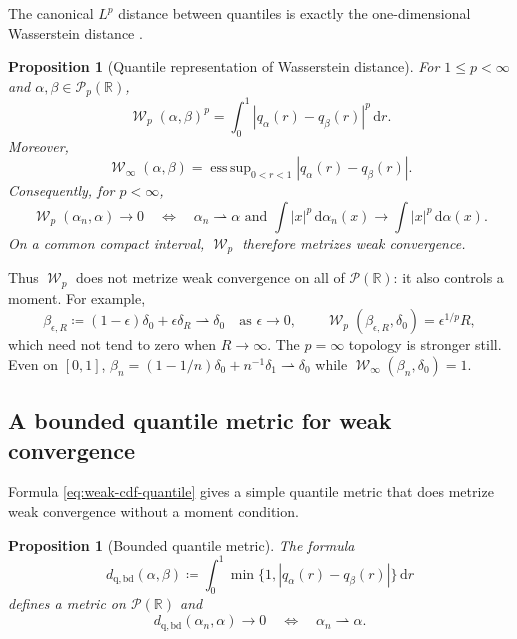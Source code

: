 \documentclass[11pt]{article}
\newtheorem{proposition}[theorem]{Proposition}
\newcommand{\RR}{\mathbb R}
\newcommand{\Pp}{\mathcal P}
\renewcommand{\d}{\,\mathrm d}
\newcommand{\al}{\alpha}
\newcommand{\be}{\beta}
\newcommand{\de}{\delta}
\newcommand{\eps}{\epsilon}
\DeclareMathOperator{\Wass}{\mathcal W}
\newcommand{\eqdef}{\coloneqq}
\begin{document}
The canonical $L^p$ distance between quantiles is exactly the
one-dimensional Wasserstein distance \cite{Vallender1974,Villani2009}.

\begin{proposition}[Quantile representation of Wasserstein distance]
\label{prop:quantile-wasserstein}
For $1\leq p<\infty$ and $\al,\be\in\Pp_p(\RR)$,
\begin{equation}\label{eq:wp-quantile}
 \Wass_p(\al,\be)^p
 =\int_0^1 |q_\al(r)-q_\be(r)|^p\d r.
\end{equation}
Moreover,
\begin{equation}\label{eq:winfty-quantile}
 \Wass_\infty(\al,\be)
 =\mathop{\mathrm{ess\,sup}}_{0<r<1}
   |q_\al(r)-q_\be(r)|.
\end{equation}
Consequently, for $p<\infty$,
\begin{equation}\label{eq:wp-topology}
 \Wass_p(\al_n,\al)\to0
 \quad\Longleftrightarrow\quad
 \al_n\rightharpoonup\al
 \text{ and }
 \int |x|^p\d\al_n(x)\to\int |x|^p\d\al(x).
\end{equation}
On a common compact interval, $\Wass_p$ therefore metrizes weak convergence.
\end{proposition}

Thus $\Wass_p$ does not metrize weak convergence on all of $\Pp(\RR)$: it also
controls a moment.  For example,
\begin{equation}\label{eq:outlier-example}
 \be_{\eps,R}\eqdef (1-\eps)\de_0+\eps\de_R
 \rightharpoonup\de_0\quad\text{as }\eps\to0,
 \qquad
 \Wass_p(\be_{\eps,R},\de_0)=\eps^{1/p}R,
\end{equation}
which need not tend to zero when $R\to\infty$.  The $p=\infty$ topology is
stronger still.  Even on $[0,1]$,
$\be_n=(1-1/n)\de_0+n^{-1}\de_1\rightharpoonup\de_0$ while
$\Wass_\infty(\be_n,\de_0)=1$.

\subsection{A bounded quantile metric for weak convergence}

Formula \eqref{eq:weak-cdf-quantile} gives a simple quantile metric that does
metrize weak convergence without a moment condition.

\begin{proposition}[Bounded quantile metric]
\label{prop:bounded-quantile}
The formula
\begin{equation}\label{eq:bounded-quantile}
 d_{\mathrm{q,bd}}(\al,\be)
 \eqdef\int_0^1 \min\{1,|q_\al(r)-q_\be(r)|\}\d r
\end{equation}
defines a metric on $\Pp(\RR)$ and
\begin{equation*}
 d_{\mathrm{q,bd}}(\al_n,\al)\to0
 \quad\Longleftrightarrow\quad
 \al_n\rightharpoonup\al.
\end{equation*}
\end{proposition}
\end{document}

